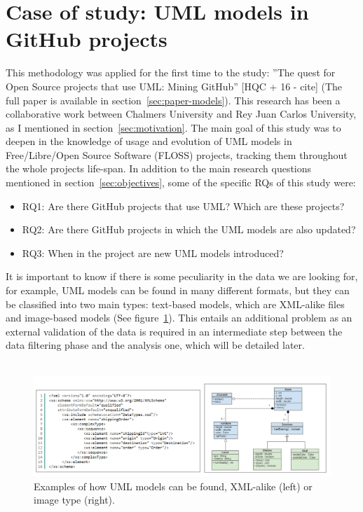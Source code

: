 \documentclass[a4paper, 12pt]{book}
\begin{document}
\section{Case of study: UML models in GitHub projects}
\label{sec:case-study-uml}
This methodology was applied for the first time to the study: ”The quest for Open Source projects that use
UML: Mining GitHub” [HQC + 16 - cite] (The full paper is available in section~\ref{sec:paper-models}).
This research has been a collaborative work between Chalmers University and Rey Juan Carlos University, as I mentioned in section~\ref{sec:motivation}.
The main goal of this study was to deepen in the knowledge of usage and evolution of UML models in
Free/Libre/Open Source Software (FLOSS) projects, tracking them throughout the whole projects life-span.
In addition to the main research questions mentioned in section~\ref{sec:objectives}, some of the specific RQs
of this study were:
\begin{itemize}
  \item RQ1: Are there GitHub projects that use UML? Which are these projects?
  \item RQ2: Are there GitHub projects in which the UML models are also updated?
  \item RQ3: When in the project are new UML models introduced?
\end{itemize}
It is important to know if there is some peculiarity in the data we are looking for, for example, UML models can be
found in many different formats, but they can be classified into two main types: text-based models, which are XML-alike
files and image-based models (See figure~\ref{fig:uml-types}). This entails an additional problem as an external validation of the data is
required in an intermediate step between the data filtering phase and the analysis one, which will be detailed later.\\\\
\begin{figure}
  \centering
  \includegraphics[width=15cm, keepaspectratio]{img/umls-landscape}
  \caption{Examples of how UML models can be found, XML-alike (left) or image type (right).}
  \label{fig:uml-types}
\end{figure}
\end{document}
